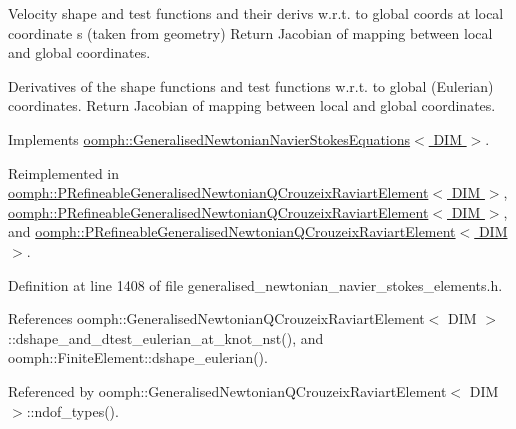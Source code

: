 Velocity shape and test functions and their derivs w.\+r.\+t. to global coords at local coordinate s (taken from geometry) Return Jacobian of mapping between local and global coordinates. 

Derivatives of the shape functions and test functions w.\+r.\+t. to global (Eulerian) coordinates. Return Jacobian of mapping between local and global coordinates. 

Implements \hyperlink{classoomph_1_1GeneralisedNewtonianNavierStokesEquations_a2607956e6619a4d3ef900bf65dd1ee8f}{oomph\+::\+Generalised\+Newtonian\+Navier\+Stokes\+Equations$<$ D\+I\+M $>$}.



Reimplemented in \hyperlink{classoomph_1_1PRefineableGeneralisedNewtonianQCrouzeixRaviartElement_a4d78303b555e3453b5dc92d25ce60c4c}{oomph\+::\+P\+Refineable\+Generalised\+Newtonian\+Q\+Crouzeix\+Raviart\+Element$<$ D\+I\+M $>$}, \hyperlink{classoomph_1_1PRefineableGeneralisedNewtonianQCrouzeixRaviartElement_a2524fa4ced356156df1882df4b3d1b91}{oomph\+::\+P\+Refineable\+Generalised\+Newtonian\+Q\+Crouzeix\+Raviart\+Element$<$ D\+I\+M $>$}, and \hyperlink{classoomph_1_1PRefineableGeneralisedNewtonianQCrouzeixRaviartElement_a4cc8b7e4932fe27129f5e6b4dcba07dc}{oomph\+::\+P\+Refineable\+Generalised\+Newtonian\+Q\+Crouzeix\+Raviart\+Element$<$ D\+I\+M $>$}.



Definition at line 1408 of file generalised\+\_\+newtonian\+\_\+navier\+\_\+stokes\+\_\+elements.\+h.



References oomph\+::\+Generalised\+Newtonian\+Q\+Crouzeix\+Raviart\+Element$<$ D\+I\+M $>$\+::dshape\+\_\+and\+\_\+dtest\+\_\+eulerian\+\_\+at\+\_\+knot\+\_\+nst(), and oomph\+::\+Finite\+Element\+::dshape\+\_\+eulerian().



Referenced by oomph\+::\+Generalised\+Newtonian\+Q\+Crouzeix\+Raviart\+Element$<$ D\+I\+M $>$\+::ndof\+\_\+types().

\mbox{\label{classoomph_1_1GeneralisedNewtonianQCrouzeixRaviartElement_abbd85f033c570ea3d4e4033639436998}} 
